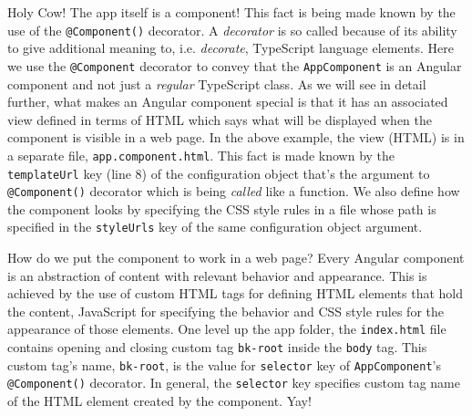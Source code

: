 \documentclass[10pt]{•}\documentclass{report}
\begin{document}
Holy Cow! The app itself is a component! This fact is being made known by the use of the \verb|@Component()| decorator. A \textsl{decorator} is so called because of its ability to give additional meaning to, i.e. \textsl{decorate}, TypeScript language elements. Here we use the \verb|@Component| decorator to convey that the \verb|AppComponent| is an Angular component and not just a \textsl{regular} TypeScript class. As we will see in detail further, what makes an Angular component special is that it has an associated view defined in terms of HTML which says what will be displayed when the component is visible in a web page. In the above example, the view (HTML) is in a separate file, \texttt{app.component.html}. This fact is made known by the \verb|templateUrl| key (line 8) of the configuration object that's the argument to \verb|@Component()| decorator which is being \textsl{called} like a function. We also define how the component looks by specifying the CSS style rules in a file whose path is specified in the \verb|styleUrls| key of the same configuration object argument.

How do we put the component to work in a web page? Every Angular component is an abstraction of content with relevant behavior and appearance. This is achieved by the use of custom HTML tags for defining HTML elements that hold the content, JavaScript for specifying the behavior and CSS style rules for the appearance of those elements. One level up the app folder, the \texttt{index.html} file contains opening and closing custom tag \verb|bk-root| inside the \verb|body| tag. This custom tag's name, \verb|bk-root|, is the value for \verb|selector| key of \verb|AppComponent|'s \verb|@Component()| decorator. In general, the \verb|selector| key specifies custom tag name of the HTML element created by the component. Yay!
\end{document}
